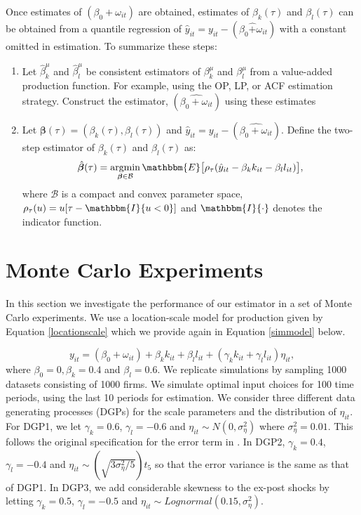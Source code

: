 \documentclass[11pt]{article}
\begin{document}
Once estimates of $(\beta_{0}+\omega_{it})$ are obtained, estimates of $\beta_{k}(\tau)$ and $\beta_{l}(\tau)$
can be obtained from a quantile regression of $\hat{y}_{it}=y_{it}-(\beta_{0}\hat{+}\omega_{it})$ with a constant omitted in estimation. To summarize these steps:
\begin{enumerate}
	\item Let $\hat{\beta}_{k}^{\mu}$ and $\hat{\beta}_{l}^{\mu}$ be consistent estimators of $\beta_{k}^{\mu}$ and $\beta_{l}^{\mu}$ from a value-added production function. For example, using the OP, LP, or ACF estimation strategy. Construct the estimator, $(\widehat{\beta_{0}+\omega_{it}})$ using these estimates
	\item Let $\boldsymbol{\beta}(\tau)=(\beta_{k}(\tau), \beta_{l}(\tau))$ and $\hat{y}_{it}=y_{it}-(\widehat{\beta_{0}+\omega_{it}})$. Define the two-step estimator of $\beta_{k}(\tau)$ and $\beta_{l}(\tau)$ as:
	\begin{equation*}
	\hat{\boldsymbol{\beta}}(\tau)=\underset{\boldsymbol{\beta}\in\mathcal{B}}{\operatorname{argmin}}\, \mathbbm{E}\big[\rho_{\tau}(\hat{y}_{it}-\beta_{k}k_{it}-\beta_{l}l_{it})\big],
	\end{equation*}
	where $\mathcal{B}$ is a compact and convex parameter space, $\rho_{\tau}(u)=u[\tau-\mathbbm{I}\{u<0\}]$ and $\mathbbm{I}\{\cdot\}$ denotes the indicator function.
\end{enumerate}

\section{Monte Carlo Experiments} \label{montecarlo}
In this section we investigate the performance of our estimator in a set of Monte Carlo experiments. We use a location-scale model for production given by Equation \eqref{locationscale} which we provide again in Equation \eqref{simmodel} below.

\begin{equation} \label{simmodel}
y_{it}=(\beta_{0}+\omega_{it})+\beta_{k}k_{it}+\beta_{l}l_{it}+(\gamma_{k}k_{it}+\gamma_{l}l_{it})\eta_{it},
\end{equation}
where $\beta_{0}=0, \beta_{k}=0.4$ and $\beta_{l}=0.6$. We replicate \cite{Ackerberg2015} simulations by sampling 1000 datasets consisting of 1000 firms. We simulate optimal input choices for 100 time periods, using the last 10 periods for estimation. We consider three different data generating processes (DGPs) for the scale parameters and the distribution of $\eta_{it}$. For DGP1, we let $\gamma_{k}=0.6$, $\gamma_{l}=-0.6$ and $\eta_{it}\sim N(0,\sigma_{\eta}^{2})$ where $\sigma_{\eta}^{2}=0.01$. This follows the original specification for the error term in \cite{Ackerberg2015}. In DGP2, $\gamma_{k}=0.4$, $\gamma_{l}=-0.4$ and $\eta_{it}\sim (\sqrt{3\sigma_{\eta}^{2}/5})t_{5}$ so that the error variance is the same as that of DGP1. In DGP3, we add considerable skewness to the ex-post shocks by letting $\gamma_{k}=0.5$, $\gamma_{l}=-0.5$ and $\eta_{it}\sim Lognormal(0.15,\sigma_{\eta}^{2})$. 
\end{document}
